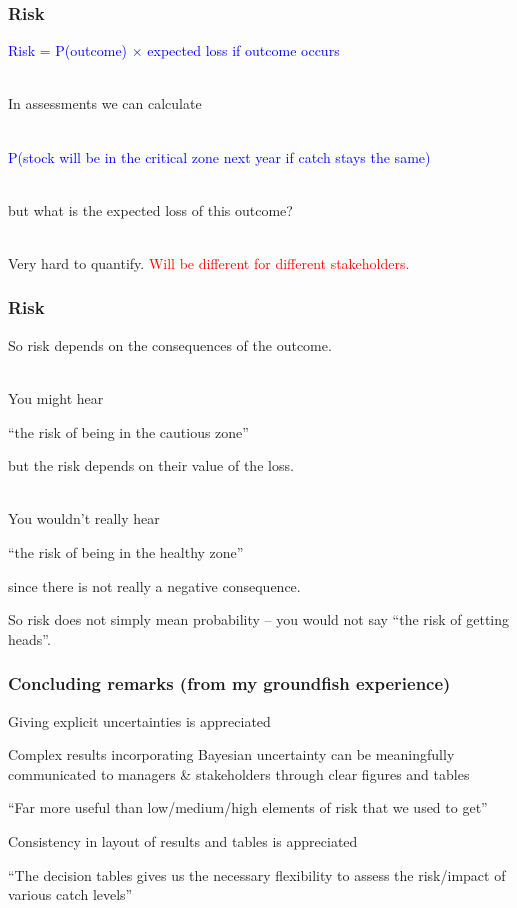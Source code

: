 \begin{frame}
\frametitle{Risk}

\bc
\textcolor{blue}{Risk = P(outcome) $\times$ expected loss if outcome occurs}
\ec

~\\

In assessments we can calculate

~\\

\bc
\textcolor{blue}{P(stock will be in the critical zone next year if catch stays the same)}
\ec

~\\

but what is the expected loss of this outcome?

~\\

Very hard to quantify. \textcolor{red}{Will be different for different stakeholders.}

\end{frame}


\begin{frame}
\frametitle{Risk}

So risk depends on the consequences of the outcome.

~\\

You might hear

\bc
\alert{``the risk of being in the cautious zone''}
\ec

but the risk depends on their value of the loss.

~\\

You wouldn't really hear

\bc
\alert{``the risk of being in the healthy zone''}
\ec

since there is not really a negative consequence.

So risk does not simply mean probability -- you would not say ``the risk of getting heads''.

\end{frame}

\begin{frame}

\frametitle{Concluding remarks (from my groundfish experience)}

\bi
\item Giving explicit uncertainties is appreciated
\item Complex results incorporating Bayesian uncertainty can be meaningfully communicated to managers \& stakeholders through clear figures and tables
\item  \alert{``Far more useful than low/medium/high elements of risk that we used to get''}
\item Consistency in layout of results and tables is appreciated
\item \alert{``The decision tables gives us the necessary flexibility to assess the risk/impact  of various catch levels''}
\ei
\end{frame}

